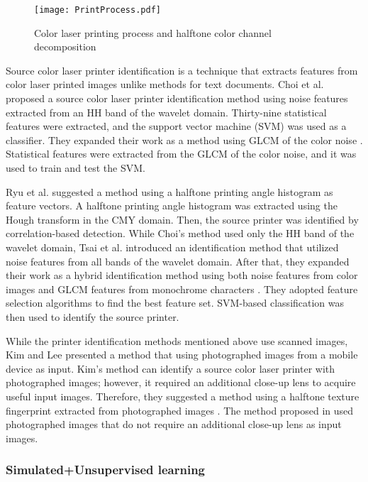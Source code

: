 \documentclass[5p, times]{elsarticle}
\begin{document}
\begin{figure*}[t!]
    \centerline{\texttt{[image: PrintProcess.pdf]}}
    \caption{Color laser printing process and halftone color channel decomposition
    } \label{PrintProcess}
\end{figure*}

Source color laser printer identification is a technique that extracts features from color laser printed images unlike methods for text documents. Choi et al. \cite{Choi1} proposed a source color laser printer identification method using noise features extracted from an HH band of the wavelet domain. Thirty-nine statistical features were extracted, and the support vector machine (SVM) was used as a classifier. They expanded their work as a method using GLCM of the color noise \cite{Choi2}. Statistical features were extracted from the GLCM of the color noise, and it was used to train and test the SVM.

Ryu et al. \cite{Ryu} suggested a method using a halftone printing angle histogram as feature vectors. A halftone printing angle histogram was extracted using the Hough transform in the CMY domain. Then, the source printer was identified by correlation-based detection. While Choi's method \cite{Choi1} used only the HH band of the wavelet domain, Tsai et al. \cite{Tsai1} introduced an identification method that utilized noise features from all bands of the wavelet domain. After that, they expanded their work as a hybrid identification method using both noise features from color images and GLCM features from monochrome characters \cite{Tsai2}. They adopted feature selection algorithms to find the best feature set. SVM-based classification was then used to identify the source printer.

While the printer identification methods mentioned above use scanned images, Kim and Lee \cite{Kim1} presented a method that using photographed images from a mobile device as input. Kim's method can identify a source color laser printer with photographed images; however, it required an additional close-up lens to acquire useful input images. Therefore, they suggested a method using a halftone texture fingerprint extracted from photographed images \cite{Kim2}. The method proposed in \cite{Kim2} used photographed images that do not require an additional close-up lens as input images. 

\subsubsection{Simulated+Unsupervised learning}
\end{document}
